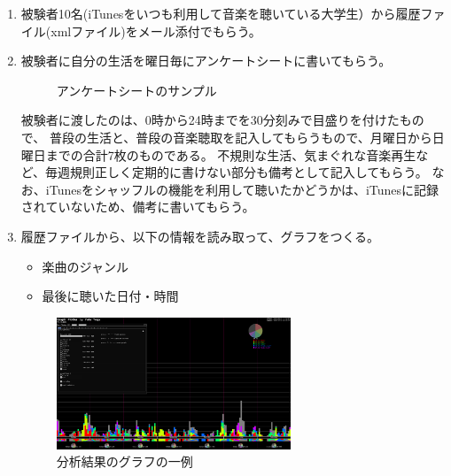 \documentclass[11pt, twocolumn]{jsarticle}
\begin{document}
\begin{enumerate}
\item
被験者10名(iTunesをいつも利用して音楽を聴いている大学生）から履歴ファイル(xmlファイル)をメール添付でもらう。

\item
被験者に自分の生活を曜日毎にアンケートシートに書いてもらう。
\begin{figure}[htbp]
\begin{center}
\caption{アンケートシートのサンプル}
\end{center}
\end{figure}

被験者に渡したのは、0時から24時までを30分刻みで目盛りを付けたもので、
普段の生活と、普段の音楽聴取を記入してもらうもので、月曜日から日曜日までの合計7枚のものである。
不規則な生活、気まぐれな音楽再生など、毎週規則正しく定期的に書けない部分も備考として記入してもらう。
なお、iTunesをシャッフルの機能を利用して聴いたかどうかは、iTunesに記録されていないため、備考に書いてもらう。
\item
履歴ファイルから、以下の情報を読み取って、グラフをつくる。
\begin{itemize}
\item
楽曲のジャンル
\item
最後に聴いた日付・時間
\end{itemize}

\begin{figure}
\begin{center}
\includegraphics[width=7cm]{graph_sample.png}
\caption{分析結果のグラフの一例}
\end{center}
\end{figure}


\end{enumerate}
\end{document}
